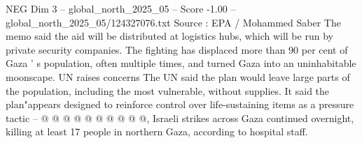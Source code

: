 \begin{textsample}{NEG Dim 3 – global\_north\_2025\_05 – Score -1.00 – global\_north\_2025\_05/124327076.txt}
Source : EPA / Mohammed Saber The memo said the aid will be distributed at logistics hubs, which will be run by private security companies.
The fighting has displaced more than 90 per cent of Gaza ' s population, often multiple times, and turned Gaza into an uninhabitable moonscape.
UN raises concerns The UN said the plan would leave large parts of the population, including the most vulnerable, without supplies.
It said the plan"appears designed to reinforce control over life-sustaining items as a pressure tactic -- @ @ @ @ @ @ @ @ @ @, Israeli strikes across Gaza continued overnight, killing at least 17 people in northern Gaza, according to hospital staff.

\end{textsample}
